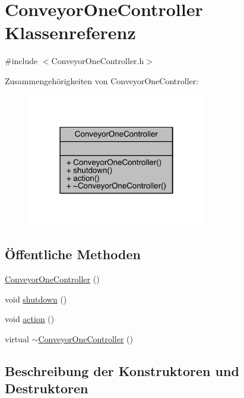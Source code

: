 \hypertarget{class_conveyor_one_controller}{}\section{Conveyor\+One\+Controller Klassenreferenz}
\label{class_conveyor_one_controller}


{\ttfamily \#include $<$Conveyor\+One\+Controller.\+h$>$}



Zusammengehörigkeiten von Conveyor\+One\+Controller\+:
\nopagebreak
\begin{figure}[H]
\begin{center}
\leavevmode
\includegraphics[width=222pt]{class_conveyor_one_controller__coll__graph}
\end{center}
\end{figure}
\subsection*{Öffentliche Methoden}
\begin{DoxyCompactItemize}
\item 
\hyperlink{class_conveyor_one_controller_ab93770638de1fbf75612b8886b48ce83}{Conveyor\+One\+Controller} ()
\item 
void \hyperlink{class_conveyor_one_controller_a837b5b29b5933795413a50446abd9861}{shutdown} ()
\item 
void \hyperlink{class_conveyor_one_controller_a4afc5302a370ec6b1d19514df56ce64c}{action} ()
\item 
virtual \hyperlink{class_conveyor_one_controller_a7e284560fd1dd2b55b38418b3b7e9e16}{$\sim$\+Conveyor\+One\+Controller} ()
\end{DoxyCompactItemize}


\subsection{Beschreibung der Konstruktoren und Destruktoren}
\hypertarget{class_conveyor_one_controller_ab93770638de1fbf75612b8886b48ce83}{}\label{class_conveyor_one_controller_ab93770638de1fbf75612b8886b48ce83} 
